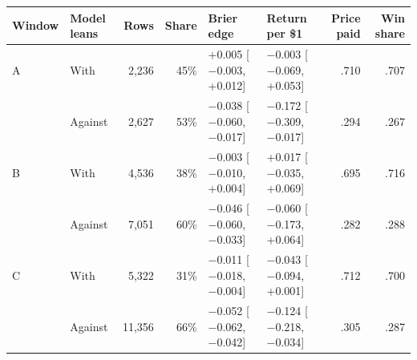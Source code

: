 \begingroup\footnotesize\setlength{\tabcolsep}{3pt}%
\begin{tabular}{@{}llrrllrr@{}}
\toprule
Window & Model leans & Rows & Share & Brier edge & Return per \$1 & Price paid & Win share \\
\midrule
A & With & 2{,}236 & 45\% & +0.005 {\scriptsize[$-$0.003, +0.012]} & $-$0.003 {\scriptsize[$-$0.069, +0.053]} & .710 & .707 \\
 & Against & 2{,}627 & 53\% & $-$0.038 {\scriptsize[$-$0.060, $-$0.017]} & $-$0.172 {\scriptsize[$-$0.309, $-$0.017]} & .294 & .267 \\
\addlinespace
B & With & 4{,}536 & 38\% & $-$0.003 {\scriptsize[$-$0.010, +0.004]} & +0.017 {\scriptsize[$-$0.035, +0.069]} & .695 & .716 \\
 & Against & 7{,}051 & 60\% & $-$0.046 {\scriptsize[$-$0.060, $-$0.033]} & $-$0.060 {\scriptsize[$-$0.173, +0.064]} & .282 & .288 \\
\addlinespace
C & With & 5{,}322 & 31\% & $-$0.011 {\scriptsize[$-$0.018, $-$0.004]} & $-$0.043 {\scriptsize[$-$0.094, +0.001]} & .712 & .700 \\
 & Against & 11{,}356 & 66\% & $-$0.052 {\scriptsize[$-$0.062, $-$0.042]} & $-$0.124 {\scriptsize[$-$0.218, $-$0.034]} & .305 & .287 \\
\bottomrule
\end{tabular}
\endgroup
